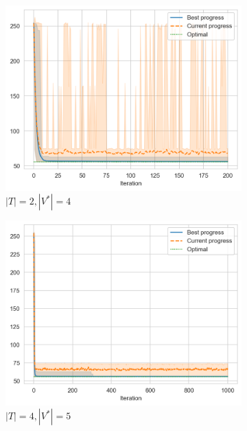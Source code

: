 \begin{figure}[ht]
    \centering
    \hfill
    \begin{subfigure}{0.3\textwidth}
        \includegraphics[width=\textwidth]{../images/p2/default.png}
        \caption{\(|T| = 2, |V^*| = 4\)}
    \end{subfigure}
    \hfill
    \begin{subfigure}{0.3\textwidth}
        \centering
        \includegraphics[width=\textwidth]{../images/p2/small-incr.png}
        \caption{\(|T| = 4, |V^*| = 5\)}
    \end{subfigure}
    \hfill
    \begin{subfigure}{0.3\textwidth}

\end{subfigure}
\end{figure}
